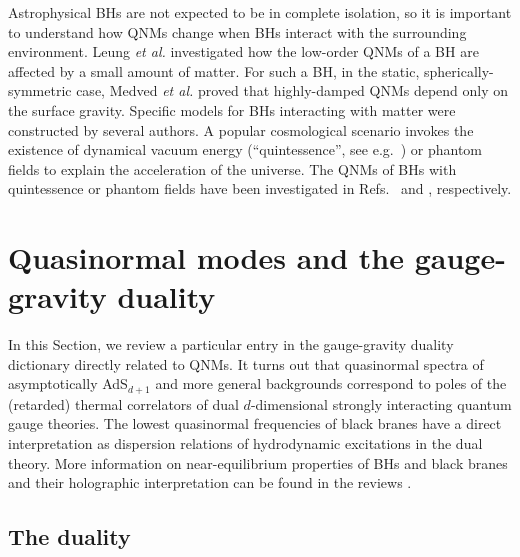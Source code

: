 \documentclass[]{iopart}
\begin{document}
Astrophysical BHs are not expected to be in complete isolation, so it is
important to understand how QNMs change when BHs interact with the surrounding
environment. Leung {\it et al.} \cite{Leung:1999rh,Leung:1999iq} investigated
how the low-order QNMs of a BH are affected by a small amount of matter. For
such a BH, in the static, spherically-symmetric case, Medved {\it et al.}
\cite{Medved:2003rga,Medved:2003pr} proved that highly-damped QNMs depend only
on the surface gravity.
%
Specific models for BHs interacting with matter were constructed by several
authors. A popular cosmological scenario invokes the existence of dynamical
vacuum energy (``quintessence'', see e.g.~\cite{Carroll:1998zi,Zlatev:1998tr})
or phantom fields \cite{Caldwell:1999ew,McInnes:2001zw} to explain the
acceleration of the universe. The QNMs of BHs with quintessence or phantom
fields have been investigated in
Refs.~\cite{Chen:2005qh,Zhang:2006hh,Ma:2006by,Zhang:2006ij,
  Zhang:2007nu,Varghese:2008ky} and \cite{Chen:2008xb}, respectively.


\section{\label{sec:holography}Quasinormal modes and the gauge-gravity duality}

In this Section, we review a particular entry in the gauge-gravity duality
dictionary directly related to QNMs. It turns out that quasinormal spectra of
asymptotically AdS$_{d+1}$ and more general backgrounds correspond to poles of
the (retarded) thermal correlators of dual $d$-dimensional strongly
interacting quantum gauge theories.  The lowest quasinormal frequencies of
black branes have a direct interpretation as dispersion relations of
hydrodynamic excitations in the dual theory.
More information on near-equilibrium properties of BHs and black branes and
their holographic interpretation can be found in the reviews \cite{Son:2007vk,
  Damour:2008ji, Gubser:2009md, Hartnoll:2009sz, Herzog:2009xv}.

\subsection{\label{subsec:duality}The duality}
\end{document}
